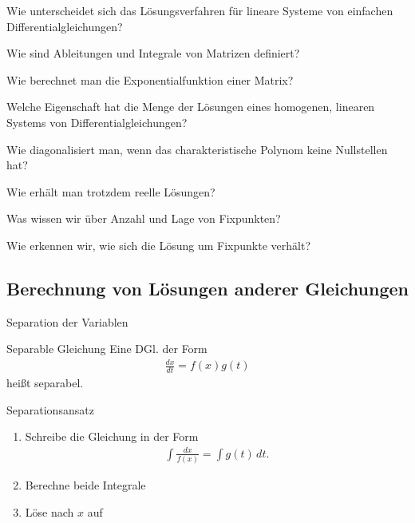 
\begin{Abschluss}
\item Wie unterscheidet sich das Lösungsverfahren für lineare Systeme
  von einfachen Differentialgleichungen?
\item Wie sind Ableitungen und Integrale von Matrizen definiert?
\item Wie berechnet man die Exponentialfunktion einer Matrix?
\item Welche Eigenschaft hat die Menge der Lösungen eines homogenen,
  linearen Systems von Differentialgleichungen?
\item Wie diagonalisiert man, wenn das charakteristische Polynom keine
  Nullstellen hat?
\item Wie erhält man trotzdem reelle Lösungen?
\item Was wissen wir über Anzahl und Lage von Fixpunkten?
\item Wie erkennen wir, wie sich die Lösung um Fixpunkte verhält?
\end{Abschluss}

\subsection{Berechnung von Lösungen anderer Gleichungen}

\begin{frame}{Separation der Variablen}
  \begin{block}{Separable Gleichung}
    Eine DGl. der Form
    \begin{gather*}
      \frac{dx}{dt} = f(x)g(t)
    \end{gather*}
    heißt separabel.
  \end{block}

  \pause
  \begin{block}{Separationsansatz}
    \begin{enumerate}
    \item Schreibe die Gleichung in der Form
      \begin{gather*}
        \int \frac{dx}{f(x)} = \int g(t) \,dt.
      \end{gather*}
    \item Berechne beide Integrale
    \item Löse nach $x$ auf
    \end{enumerate}
  \end{block}
\end{frame}

